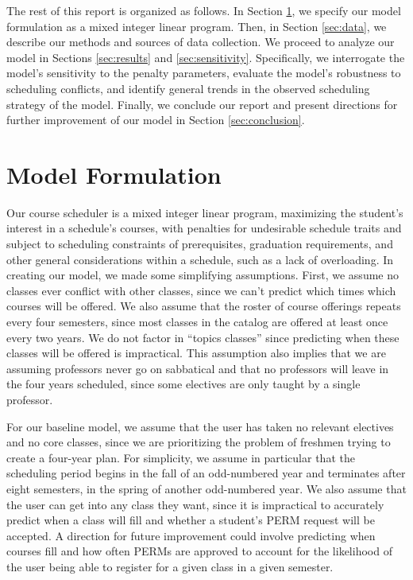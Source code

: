 \documentclass[12pt]{article}
\begin{document}
The rest of this report is organized as follows.
In Section \ref{sec:model}, we specify our model formulation as a mixed integer linear program.
Then, in Section \ref{sec:data}, we describe our methods and sources of data collection.
We proceed to analyze our model in Sections \ref{sec:results} and \ref{sec:sensitivity}.
Specifically, we interrogate the model's sensitivity to the penalty parameters, evaluate the model's robustness to scheduling conflicts, and identify general trends in the observed scheduling strategy of the model.
Finally, we conclude our report and present directions for further improvement of our model in Section \ref{sec:conclusion}.

\section{Model Formulation}\label{sec:model}

Our course scheduler is a mixed integer linear program, maximizing the student's interest in a schedule's courses, with penalties for undesirable schedule traits and subject to scheduling constraints of prerequisites, graduation requirements, and other general considerations within a schedule, such as a lack of overloading.
In creating our model, we made some simplifying assumptions.
First, we assume no classes ever conflict with other classes, since we can’t predict which times which courses will be offered.
We also assume that the roster of course offerings repeats every four semesters, since most classes in the catalog are offered at least once every two years. We do not factor in ``topics classes'' since predicting when these classes will be offered is impractical.
This assumption also implies that we are assuming professors never go on sabbatical and that no professors will leave in the four years scheduled, since some electives are only taught by a single professor.

For our baseline model, we assume that the user has taken no relevant electives and no core classes, since we are prioritizing the problem of freshmen trying to create a four-year plan.
For simplicity, we assume in particular that the scheduling period begins in the fall of an odd-numbered year and terminates after eight semesters, in the spring of another odd-numbered year.
We also assume that the user can get into any class they want, since it is impractical to accurately predict when a class will fill and whether a student’s PERM request will be accepted.
A direction for future improvement could involve predicting when courses fill and how often PERMs are approved to account for the likelihood of the user being able to register for a given class in a given semester.
\end{document}
